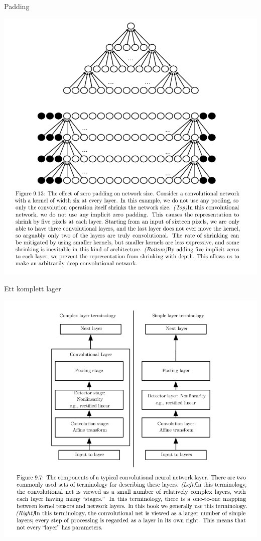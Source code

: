 \documentclass[10pt,english]{beamer}
\begin{document}
\begin{frame}{Padding}
    
    \includegraphics[height=\textheight]{figs/padding.png}

\end{frame}

\begin{frame}{Ett komplett lager}

    \includegraphics[height=\textheight]{figs/typical convolutional neural network layer.png}
    
\end{frame}
\end{document}
